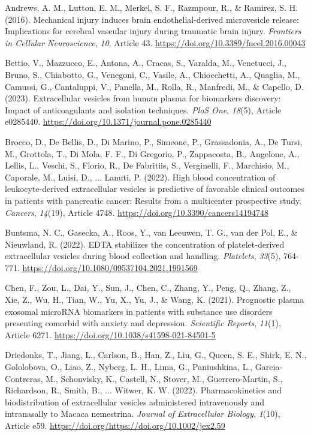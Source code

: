 \documentclass[authordate, empirical, issue]{jote-new-article}
\begin{document}
	Andrews, A. M., Lutton, E. M., Merkel, S. F., Razmpour, R., \& Ramirez, S. H. (2016). Mechanical injury induces brain endothelial-derived microvesicle release: Implications for cerebral vascular injury during traumatic brain injury. \emph{Frontiers in Cellular Neuroscience},\emph{ 10}, Article 43. \url{https://doi.org/10.3389/fncel.2016.00043}



	Bettio, V., Mazzucco, E., Antona, A., Cracas, S., Varalda, M., Venetucci, J., Bruno, S., Chiabotto, G., Venegoni, C., Vasile, A., Chiocchetti, A., Quaglia, M., Camussi, G., Cantaluppi, V., Panella, M., Rolla, R., Manfredi, M., \& Capello, D. (2023). Extracellular vesicles from human plasma for biomarkers discovery: Impact of anticoagulants and isolation techniques. \emph{PloS One},\emph{ 18}(5), Article e0285440. \url{https://doi.org/10.1371/journal.pone.0285440}



	Brocco, D., De Bellis, D., Di Marino, P., Simeone, P., Grassadonia, A., De Tursi, M., Grottola, T., Di Mola, F. F., Di Gregorio, P., Zappacosta, B., Angelone, A., Lellis, L., Veschi, S., Florio, R., De Fabritiis, S., Verginelli, F., Marchisio, M., Caporale, M., Luisi, D., ... Lanuti, P. (2022). High blood concentration of leukocyte-derived extracellular vesicles is predictive of favorable clinical outcomes in patients with pancreatic cancer: Results from a multicenter prospective study. \emph{Cancers},\emph{ 14}(19), Article 4748. \url{https://doi.org/10.3390/cancers14194748}



	Buntsma, N. C., Gasecka, A., Roos, Y., van Leeuwen, T. G., van der Pol, E., \& Nieuwland, R. (2022). EDTA stabilizes the concentration of platelet-derived extracellular vesicles during blood collection and handling. \emph{Platelets},\emph{ 33}(5), 764-771. \url{https://doi.org/10.1080/09537104.2021.1991569}



	Chen, F., Zou, L., Dai, Y., Sun, J., Chen, C., Zhang, Y., Peng, Q., Zhang, Z., Xie, Z., Wu, H., Tian, W., Yu, X., Yu, J., \& Wang, K. (2021). Prognostic plasma exosomal microRNA biomarkers in patients with substance use disorders presenting comorbid with anxiety and depression. \emph{Scientific Reports},\emph{ 11}(1), Article 6271. \url{https://doi.org/10.1038/s41598-021-84501-5}



	Driedonks, T., Jiang, L., Carlson, B., Han, Z., Liu, G., Queen, S. E., Shirk, E. N., Gololobova, O., Liao, Z., Nyberg, L. H., Lima, G., Paniushkina, L., Garcia-Contreras, M., Schonvisky, K., Castell, N., Stover, M., Guerrero-Martin, S., Richardson, R., Smith, B., ... Witwer, K. W. (2022). Pharmacokinetics and biodistribution of extracellular vesicles administered intravenously and intranasally to Macaca nemestrina. \emph{Journal of Extracellular Biology},\emph{ 1}(10), Article e59. \url{https://doi.org/https://doi.org/10.1002/jex2.59}
\end{document}
